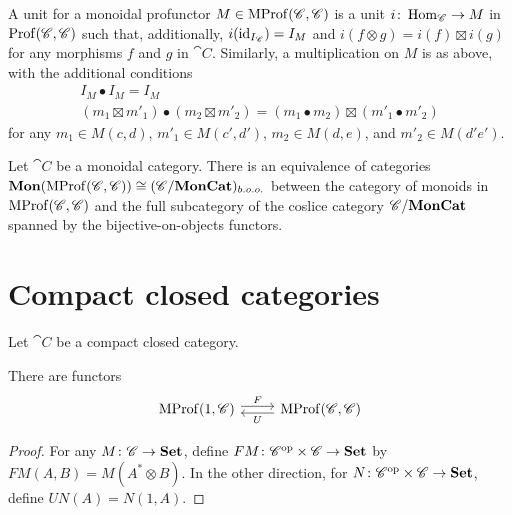 \documentclass[12pt,oneside,article,draft]{memoir}
\begin{document}
A unit for a monoidal profunctor $M\in\operatorname{MProf}(\mathscr{C},\mathscr{C})$ is a unit $i\colon\operatorname{Hom}_{\mathscr{C}}\to M$ in $\operatorname{Prof}(\mathscr{C},\mathscr{C})$ such that, additionally, $i(\operatorname{id}_{I_{\mathscr{C}}})=I_M$ and $i(f\otimes g)=i(f)\boxtimes i(g)$ for any morphisms $f$ and $g$ in $\cat{C}$. Similarly, a multiplication on $M$ is as above, with the additional conditions
\begin{gather*}
	I_M\bullet I_M=I_M \\
	(m_1\boxtimes m'_1)\bullet(m_2\boxtimes m'_2) = (m_1\bullet m_2)\boxtimes(m'_1\bullet m'_2)
\end{gather*}
for any $m_1\in M(c,d)$, $m'_1\in M(c',d')$, $m_2\in M(d,e)$, and $m'_2\in M(d'e')$.

\begin{lemma}
	Let $\cat{C}$ be a monoidal category. There is an equivalence of categories $\mathbf{Mon}(\operatorname{MProf}(\mathscr{C},\mathscr{C}))\cong (\mathscr{C}/\mathbf{MonCat})_{b.o.o.}$ between the category of monoids in $\operatorname{MProf}(\mathscr{C},\mathscr{C})$ and the full subcategory of the coslice category $\mathscr{C}/\mathbf{MonCat}$ spanned by the bijective-on-objects functors.
\end{lemma}

\section{Compact closed categories}

Let $\cat{C}$ be a compact closed category.

\begin{proposition}
	There are functors
	\[
	\begin{tikzcd}
		\MProf(1,\cat{C}) \ar[r,shift left,"F"]
		& \MProf(\cat{C},\cat{C}) \ar[l,shift left,"U"]
	\end{tikzcd}
	\]
\end{proposition}
\begin{proof}
	For any $M\colon\mathscr{C}\to\mathbf{Set}$, define $FM\colon{\mathscr{C}}^{\text{op}}\times\mathscr{C}\to\mathbf{Set}$ by $FM(A,B)=M(A^*\otimes B)$. In the other direction, for $N\colon{\mathscr{C}}^{\text{op}}\times\mathscr{C}\to\mathbf{Set}$, define $UN(A)=N(1,A)$.
\end{proof}
\end{document}
